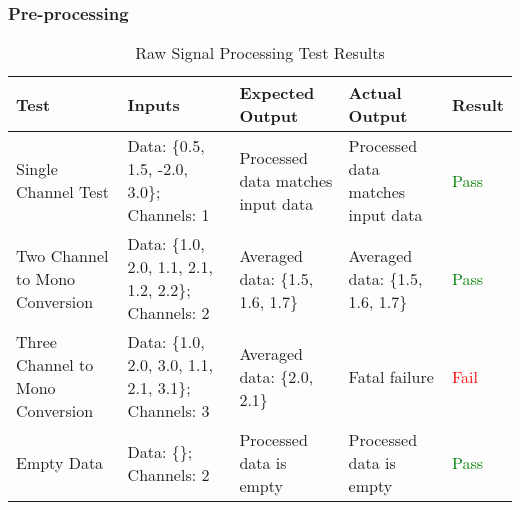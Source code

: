 \documentclass[12pt, titlepage]{article}
\begin{document}
\subsubsection{Pre-processing}
\begin{longtable}{|L{3cm}|L{3cm}|L{2.5cm}|L{2.5cm}|l|}
  \caption{Raw Signal Processing Test Results} \\
  \hline
  \textbf{Test} & \textbf{Inputs} & \textbf{Expected Output} & \textbf{Actual Output} & \textbf{Result} \\
  \hline
  Single Channel Test &
    Data: \{0.5, 1.5, -2.0, 3.0\}; \newline
    Channels: 1 &
    Processed data matches input data &
    Processed data matches input data &
    \textcolor{green}{Pass} \\
  \hline
  Two Channel to Mono Conversion &
    Data: \{1.0, 2.0, 1.1, 2.1, 1.2, 2.2\}; \newline
    Channels: 2 &
    Averaged data: \{1.5, 1.6, 1.7\} &
    Averaged data: \{1.5, 1.6, 1.7\} &
    \textcolor{green}{Pass} \\
  \hline
  Three Channel to Mono Conversion &
    Data: \{1.0, 2.0, 3.0, 1.1, 2.1, 3.1\}; \newline
    Channels: 3 &
    Averaged data: \{2.0, 2.1\} &
    Fatal failure &
    \textcolor{red}{Fail} \\
  \hline
  Empty Data &
    Data: \{\}; \newline
    Channels: 2 &
    Processed data is empty &
    Processed data is empty &
    \textcolor{green}{Pass} \\
  \hline
\end{longtable}
\end{document}
